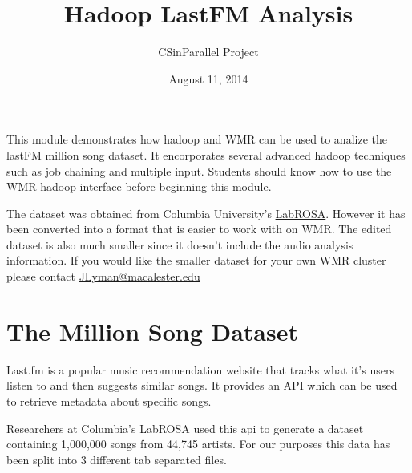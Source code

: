 \documentclass[letterpaper,10pt,openany,oneside]{sphinxmanual}
\title{Hadoop LastFM Analysis}
\date{August 11, 2014}
\author{CSinParallel Project}
\begin{document}
\maketitle
\tableofcontents
{}\label{index::doc}


This module demonstrates how hadoop and WMR can be used to
analize the lastFM million song dataset. It encorporates several
advanced hadoop techniques such as job chaining and multiple
input. Students should know how to use the WMR hadoop interface
before beginning this module.

The dataset was obtained from Columbia University's
\href{http://labrosa.ee.columbia.edu/millionsong/lastfm}{LabROSA}.
However it has been converted into a format that is easier to work
with on WMR. The edited dataset is also much smaller since it doesn't
include the audio analysis information. If you would like the smaller
dataset for your own WMR cluster please contact \href{mailto:JLyman@macalester.edu}{JLyman@macalester.edu}


\chapter{The Million Song Dataset}
\label{0-Introduction/Introduction::doc}\label{0-Introduction/Introduction:the-million-song-dataset}\label{0-Introduction/Introduction:hadoop-lastfm-analysis}
Last.fm is a popular music recommendation website that tracks
what it's users listen to and then suggests similar songs.
It provides an API which can be used to retrieve metadata about
specific songs.

Researchers at Columbia's LabROSA used this api to generate a
dataset containing 1,000,000 songs from 44,745 artists. For our
purposes this data has been split into 3 different tab separated
files.
\end{document}
